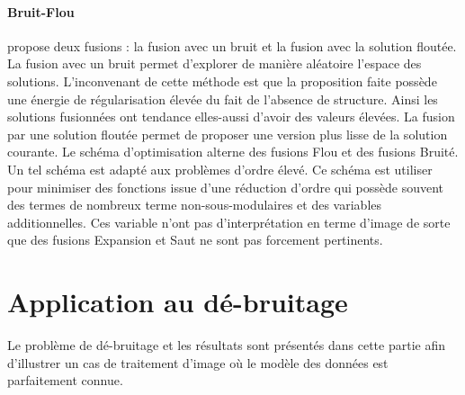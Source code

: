 \documentclass[../main/These_Mathias_Paget.tex]{subfiles}
\begin{document}
	\paragraph*{Bruit-Flou}
	\cite{Ishikawa11PAMI} propose deux fusions : la fusion avec un bruit et la fusion avec la solution floutée. La fusion avec un bruit permet d’explorer de manière aléatoire l'espace des solutions. L’inconvenant de cette méthode est que la proposition faite possède une énergie de régularisation élevée du fait de l'absence de structure. Ainsi les solutions fusionnées ont tendance elles-aussi d'avoir des valeurs élevées. La fusion par une solution floutée permet de proposer une version plus lisse de la solution courante. Le schéma d'optimisation alterne des fusions Flou et des fusions Bruité. Un tel schéma est adapté aux problèmes d'ordre élevé. Ce schéma est utiliser pour minimiser des fonctions issue d'une réduction d'ordre qui possède souvent des termes de nombreux terme non-sous-modulaires et des variables additionnelles. Ces variable n'ont pas d'interprétation en terme d'image de sorte que des fusions Expansion et Saut ne sont pas forcement pertinents.

\section{Application au dé-bruitage}

Le problème de dé-bruitage et les résultats sont présentés dans cette partie afin d’illustrer un cas de traitement d'image où le modèle des données est parfaitement connue.
\end{document}
